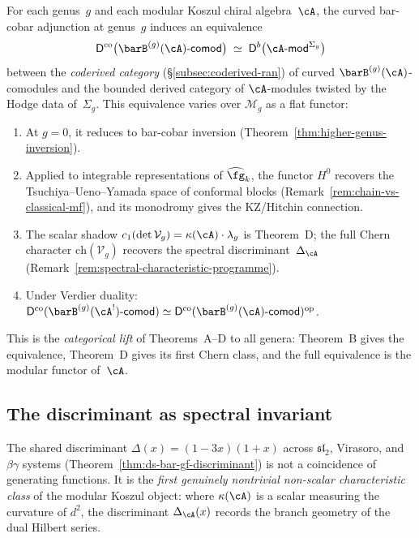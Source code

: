 \begin{conjecture}%
\label{conj:categorical-modular-kd}%
%
For each genus~$g$ and each modular Koszul chiral
algebra~$\cA$, the curved bar-cobar adjunction at genus~$g$
induces an equivalence
\[
\mathsf{D}^{\mathrm{co}}
\bigl(\barB^{(g)}(\cA)\text{-}\mathsf{comod}\bigr)
\;\simeq\;
\mathsf{D}^b\bigl(\cA\text{-}\mathsf{mod}^{\Sigma_g}\bigr)
\]
between the \emph{coderived category}
\textup{(}\S\textup{\ref{subsec:coderived-ran})} of curved
$\barB^{(g)}(\cA)$-comodules and the bounded derived category of
$\cA$-modules twisted by the Hodge data of~$\Sigma_g$.
This equivalence varies over $\mathcal{M}_g$ as a flat functor:
\begin{enumerate}[label=\textup{(\roman*)}]
\item At $g = 0$, it reduces to bar-cobar inversion
  \textup{(}Theorem~\textup{\ref{thm:higher-genus-inversion})}.
\item Applied to integrable representations of
  $\widehat{\fg}_k$, the functor $H^0$ recovers the
  Tsuchiya--Ueno--Yamada space of conformal blocks
  \textup{(}Remark~\textup{\ref{rem:chain-vs-classical-mf})},
  and its monodromy gives the KZ/Hitchin connection.
\item The scalar shadow
  $c_1(\det \mathcal{V}_g) = \kappa(\cA) \cdot \lambda_g$
  is Theorem~D; the full Chern character
  $\mathrm{ch}(\mathcal{V}_g)$
  recovers the spectral discriminant~$\Delta_{\cA}$
  \textup{(}Remark~\textup{\ref{rem:spectral-characteristic-programme})}.
\item Under Verdier duality:
  $\mathsf{D}^{\mathrm{co}}(\barB^{(g)}(\cA^!)\text{-}\mathsf{comod})
  \simeq
  \mathsf{D}^{\mathrm{co}}(\barB^{(g)}(\cA)\text{-}\mathsf{comod})^{\mathrm{op}}$.
\end{enumerate}
This is the \emph{categorical lift} of
Theorems~A--D to all genera: Theorem~B
gives the equivalence, Theorem~D gives its first Chern class,
and the full equivalence is the modular functor of~$\cA$.
\end{conjecture}

\subsection{The discriminant as spectral invariant}

The shared discriminant $\Delta(x) = (1 - 3x)(1+x)$ across
$\mathfrak{sl}_2$, Virasoro, and $\beta\gamma$ systems
(Theorem~\ref{thm:ds-bar-gf-discriminant}) is not a coincidence
of generating functions.  It is the \emph{first genuinely
nontrivial non-scalar characteristic class} of the modular Koszul
object: where $\kappa(\cA)$ is a scalar measuring the curvature
of $d^2$, the discriminant $\Delta_{\cA}(x)$ records the branch
geometry of the dual Hilbert series.

